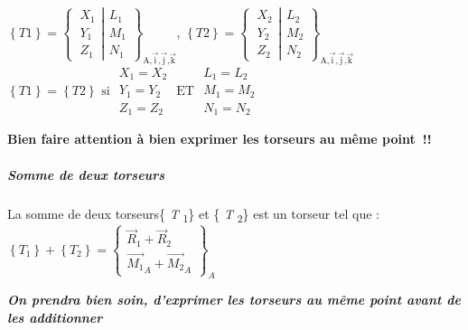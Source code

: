 \(\left\{ T1 \right\} = \left\{ \left. \ \begin{matrix}
X_{1} \\
Y_{1} \\
Z_{1}
\end{matrix} \right|\begin{matrix}
L_{1} \\
M_{1} \\
N_{1}
\end{matrix} \right\}_{\text{A,}\overrightarrow{\text{i}}\text{,}\overrightarrow{\text{j}}\text{,}\overrightarrow{\text{k}}}\),
\(\left\{ T2 \right\} = \left\{ \left. \ \begin{matrix}
X_{2} \\
Y_{2} \\
Z_{2}
\end{matrix} \right|\begin{matrix}
L_{2} \\
M_{2} \\
N_{2}
\end{matrix} \right\}_{\text{A,}\overrightarrow{\text{i}}\text{,}\overrightarrow{\text{j}}\text{,}\overrightarrow{\text{k}}}\)
\(\left\{ T1 \right\} = \left\{ T2 \right\}\text{ si }\begin{matrix}
X_{1} = X_{2} \\
Y_{1} = Y_{2} \\
Z_{1} = Z_{2}
\end{matrix}\text{ ET  }\begin{matrix}
L_{1} = L_{2} \\
M_{1} = M_{2} \\
N_{1} = N_{2}
\end{matrix}\)

\textbf{Bien faire attention à bien exprimer les torseurs au même
point~!!}

\subparagraph*{Somme de deux torseurs}\label{somme-de-deux-torseurs}

La somme de deux torseurs\{ \emph{T} \textsubscript{1}\} et \{ \emph{T}
\textsubscript{2}\} est un torseur tel que :
\(\left\{ T_{1} \right\} + \left\{ T_{2} \right\} = \begin{Bmatrix}
{\overrightarrow{R}}_{1} + {\overrightarrow{R}}_{2} \\
{\overrightarrow{M_{1}}}_{A} + {\overrightarrow{M_{2}}}_{A}
\end{Bmatrix}_{A}\)

\emph{\textbf{On prendra bien soin, d'exprimer les torseurs au même
point avant de les additionner}}

